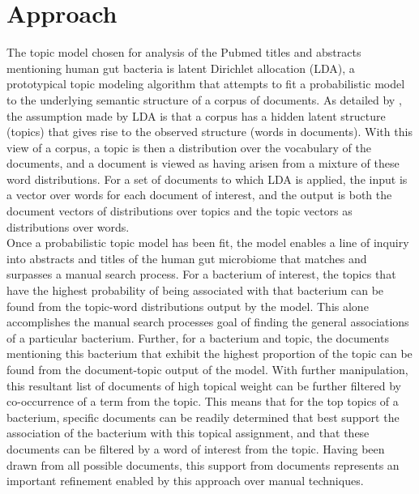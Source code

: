\documentclass{bioinfo}
\begin{document}
\section{Approach}
\indent The topic model chosen for analysis of the Pubmed titles and abstracts mentioning human gut bacteria is latent Dirichlet allocation (LDA), a prototypical topic modeling algorithm that attempts to fit a probabilistic model to the underlying semantic structure of a corpus of documents. As detailed by \citealp{Blei03}, the assumption made by LDA is that a corpus has a hidden latent structure (topics) that gives rise to the observed structure (words in documents). With this view of a corpus, a topic is then a distribution over the vocabulary of the documents, and a document is viewed as having arisen from a mixture of these word distributions. For a set of documents to which LDA is applied, the input is a vector over words for each document of interest, and the output is both the document vectors of distributions over topics and the topic vectors as distributions over words.\\
\indent Once a probabilistic topic model has been fit, the model enables a line of inquiry into abstracts and titles of the human gut microbiome that matches and surpasses a manual search process. For a bacterium of interest, the topics that have the highest probability of being associated with that bacterium can be found from the topic-word distributions output by the model. This alone accomplishes the manual search processes goal of finding the general associations of a particular bacterium. Further, for a bacterium and topic, the documents mentioning this bacterium that exhibit the highest proportion of the topic can be found from the document-topic output of the model. With further manipulation, this resultant list of documents of high topical weight can be further filtered by co-occurrence of a term from the topic. This means that for the top topics of a bacterium, specific documents can be readily determined that best support the association of the bacterium with this topical assignment, and that these documents can be filtered by a word of interest from the topic. Having been drawn from all possible documents, this support from documents represents an important refinement enabled by this approach over manual techniques. \\
\end{document}
